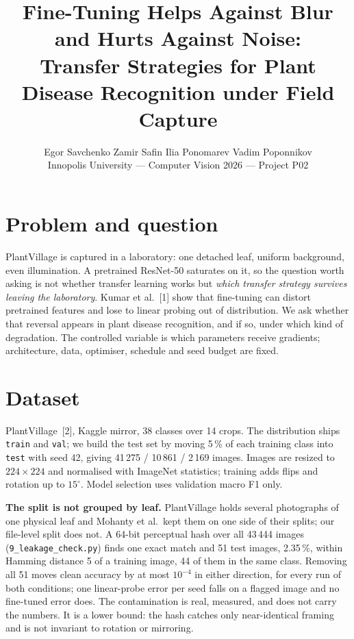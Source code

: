 \documentclass[10pt,a4paper,twocolumn]{article}
\title{\vspace{-1.3cm}\textbf{Fine-Tuning Helps Against Blur and Hurts Against Noise:\\
Transfer Strategies for Plant Disease Recognition under Field Capture}\vspace{-0.25cm}}
\author{\small Egor Savchenko \quad Zamir Safin \quad Ilia Ponomarev \quad Vadim Poponnikov\\[2pt]
\small Innopolis University --- Computer Vision 2026 --- Project P02\vspace{-0.35cm}}
\date{}
\begin{document}
\maketitle

\section{Problem and question}

PlantVillage is captured in a laboratory: one detached leaf, uniform background, even illumination.
A pretrained ResNet-50 saturates on it, so the question worth asking is not whether transfer learning
works but \emph{which transfer strategy survives leaving the laboratory}. Kumar et al.~[1]
show that fine-tuning can distort pretrained features and lose to linear probing out of
distribution. We ask whether that reversal appears in plant disease recognition, and if so, under
which kind of degradation. The controlled variable is which parameters receive gradients;
architecture, data, optimiser, schedule and seed budget are fixed.

\section{Dataset}

PlantVillage~[2], Kaggle mirror, 38 classes over 14 crops. The distribution ships
\texttt{train} and \texttt{val}; we build the test set by moving 5\,\% of each training class into
\texttt{test} with seed 42, giving 41\,275 / 10\,861 / 2\,169 images. Images are resized to
$224{\times}224$ and normalised with ImageNet statistics; training adds flips and rotation up to
$15^{\circ}$. Model selection uses validation macro F1 only.

\textbf{The split is not grouped by leaf.} PlantVillage holds several photographs of one physical
leaf and Mohanty et al.\ kept them on one side of their splits; our file-level split does not. A
64-bit perceptual hash over all 43\,444 images (\texttt{9\_leakage\_check.py}) finds one exact
match and 51 test images, 2.35\,\%, within
Hamming distance 5 of a training image, 44 of them in the same class. Removing all 51 moves clean
accuracy by at most $10^{-4}$ in either direction, for every run of both conditions; one
linear-probe error per seed falls on a flagged image and no fine-tuned error does. The contamination
is real, measured, and does not carry the numbers. It is a lower bound: the hash catches only
near-identical framing and is not invariant to rotation or mirroring.
\end{document}
